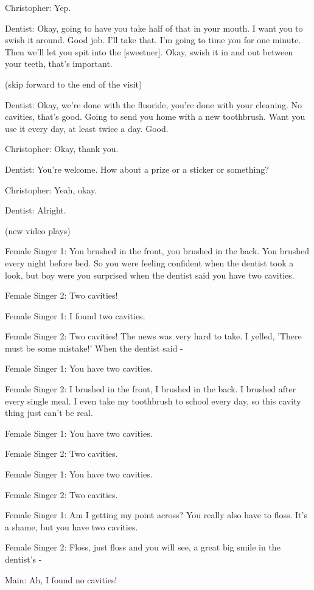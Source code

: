 Christopher: Yep.

Dentist: Okay, going to have you take half of that in your mouth. I want you to swish it around. Good job. I'll take that. I'm going to time you for one minute. Then we'll let you spit into the [sweetner]. Okay, swish it in and out between your teeth, that's important.

(skip forward to the end of the visit)

Dentist: Okay, we're done with the fluoride, you're done with your cleaning. No cavities, that's good. Going to send you home with a new toothbrush. Want you use it every day, at least twice a day. Good.

Christopher: Okay, thank you.

Dentist: You're welcome. How about a prize or a sticker or something?

Christopher: Yeah, okay.

Dentist: Alright.

(new video plays)

Female Singer 1: You brushed in the front, you brushed in the back. You brushed every night before bed. So you were feeling confident when the dentist took a look, but boy were you surprised when the dentist said you have two cavities.

Female Singer 2: Two cavities!

Female Singer 1: I found two cavities.

Female Singer 2: Two cavities! The news was very hard to take. I yelled, 'There must be some mistake!' When the dentist said -

Female Singer 1: You have two cavities.

Female Singer 2: I brushed in the front, I brushed in the back. I brushed after every single meal. I even take my toothbrush to school every day, so this cavity thing just can't be real.

Female Singer 1: You have two cavities.

Female Singer 2: Two cavities.

Female Singer 1: You have two cavities.

Female Singer 2: Two cavities.

Female Singer 1: Am I getting my point across? You really also have to floss. It's a shame, but you have two cavities.

Female Singer 2: Floss, just floss and you will see, a great big smile in the dentist's -

Main: Ah, I found no cavities!

